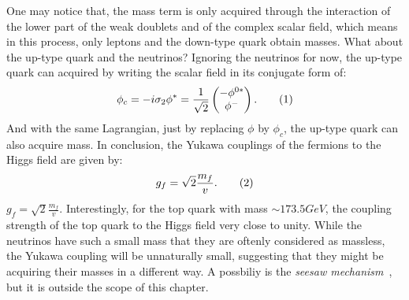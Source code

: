 One may notice that, the mass term is only acquired through the 
interaction of the lower part of the weak doublets and of the complex scalar field,
which means in this process, only leptons and the down-type quark obtain masses. 
What about the up-type quark and the neutrinos?
Ignoring the neutrinos for now, the up-type quark can acquired by writing the 
scalar field in its conjugate form of:
\[
\phi_c   =  -i\sigma_2\phi^* = \frac{1}{\sqrt{2}} \begin{pmatrix} - \phi^{0*} \\ \phi^-\\ \end{pmatrix}.
\addtag \]
And with the same Lagrangian, just by replacing $\phi$ by $\phi_c$, the up-type quark 
can also acquire mass. 
In conclusion, the Yukawa couplings of the fermions to the Higgs field are given by:
\[
g_f  =  \sqrt{2} \frac{m_f}{v}.
\addtag \]
$g_f  =  \sqrt{2} \frac{m_f}{v}.$
Interestingly, for the top quark with mass $\sim 173.5 GeV$, the coupling strength 
of the top quark to the Higgs field very close to unity. 
While the neutrinos have such a small mass that they are oftenly considered as massless,
the Yukawa coupling will be unnaturally small, suggesting that 
they might be acquiring their masses in a different way. 
A possbiliy is the \textit{seesaw mechanism}~\cite{seesaw}, 
but it is outside the scope of this chapter. 

